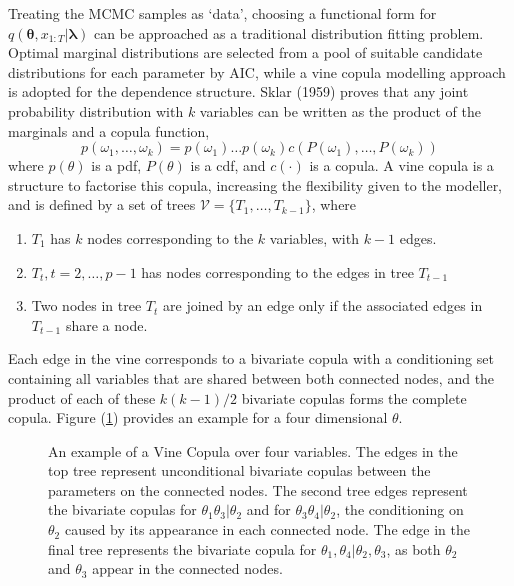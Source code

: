 \documentclass[12pt,a4paper]{article}%
\numberwithin{equation}{section}
\begin{document}
Treating the MCMC samples as `data', choosing a functional form for $q(\boldsymbol{\theta}, x_{1:T} | \boldsymbol{\lambda})$ can be approached as a traditional distribution fitting problem. Optimal marginal distributions are selected from a pool of suitable candidate distributions for each parameter by AIC, while a vine copula modelling approach is adopted for the dependence structure. Sklar (1959) proves that any joint probability distribution with $k$ variables can be written as the product of the marginals and a copula function,
\begin{equation}
\label{vc1}
p(\omega_1, \dots, \omega_k) = p(\omega_1) \dots p(\omega_k) c(P(\omega_1), \dots, P(\omega_k))
\end{equation}
where $p(\theta)$ is a pdf, $P(\theta)$ is a cdf, and $c(\cdot)$ is a copula. A vine copula is a structure to factorise this copula, increasing the flexibility given to the modeller, and is defined by a set of trees $\mathcal{V} = \{T_1, \dots, T_{k-1} \}$, where
\begin{enumerate}
\item $T_1$ has $k$ nodes corresponding to the $k$ variables, with $k-1$ edges.
\item $T_t, t = 2, \dots, p-1$ has nodes corresponding to the edges in tree $T_{t-1}$
\item Two nodes in tree $T_t$ are joined by an edge only if the associated edges in $T_{t-1}$ share a node. 
\end{enumerate}
Each edge in the vine corresponds to a bivariate copula with a conditioning set containing all variables that are shared between both connected nodes, and the product of each of these $k(k-1)/2$ bivariate copulas forms the complete copula. Figure (\ref{fig:vinecop}) provides an example for a four dimensional $\theta$.
\begin{figure}[h]
\centering
\vspace{2mm}
\caption{An example of a Vine Copula over four variables. The edges in the top tree represent unconditional bivariate copulas between the parameters on the connected nodes. The second tree edges represent the bivariate copulas for $\theta_1 \theta_3 | \theta_2$ and for $\theta_3 \theta_4 | \theta_2$, the conditioning on $\theta_2$ caused by its appearance in each connected node. The edge in the final tree represents the bivariate copula for $\theta_1, \theta_4 | \theta_2, \theta_3$, as both $\theta_2$ and $\theta_3$ appear in the connected nodes.}
\label{fig:vinecop}
\end{figure}
\end{document}

